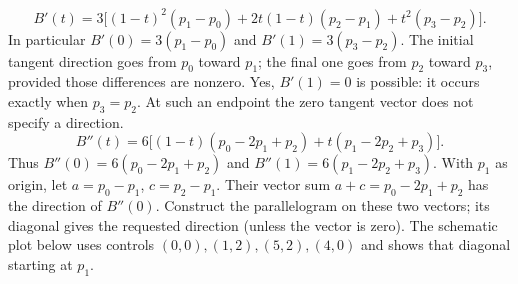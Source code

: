 \[
 B'(t)=3\big[(1-t)^2(p_1-p_0)+2t(1-t)(p_2-p_1)+t^2(p_3-p_2)\big].
\]
In particular $B'(0)=3(p_1-p_0)$ and $B'(1)=3(p_3-p_2)$.
The initial tangent direction goes from $p_0$ toward $p_1$; the final
one goes from $p_2$ toward $p_3$, provided those differences are nonzero.
Yes, $B'(1)=0$ is possible: it occurs exactly when $p_3=p_2$.
At such an endpoint the zero tangent vector does not specify a direction.
\[
 B''(t)=6\big[(1-t)(p_0-2p_1+p_2)+t(p_1-2p_2+p_3)\big].
\]
Thus $B''(0)=6(p_0-2p_1+p_2)$ and
$B''(1)=6(p_1-2p_2+p_3)$.
With $p_1$ as origin, let $a=p_0-p_1$, $c=p_2-p_1$.
Their vector sum $a+c=p_0-2p_1+p_2$ has the direction of $B''(0)$.
Construct the parallelogram on these two vectors; its diagonal gives the
requested direction (unless the vector is zero). The schematic plot below
uses controls $(0,0),(1,2),(5,2),(4,0)$ and shows that diagonal starting at $p_1$.
